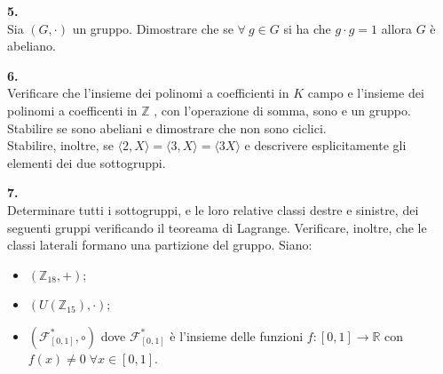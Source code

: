 \documentclass[italian,a4paper,11pt]
{article}
\newcommand{\Z}{\mathbb Z}
\newcommand{\R}{\mathbb{R}}
\newcommand{\acc}{\`}
\begin{document}
\vspace{0.4cm}
\noindent
\begin{Ex}\textbf{ 5.}\\
Sia $(G,\cdot)$ un gruppo. Dimostrare che se $\forall \ g \in G$ si ha che $g\cdot g=1$ allora $G$ \acc e abeliano.
\end{Ex}

\vspace{0.4cm}
\noindent
\begin{Ex}\textbf{ 6.}\\
Verificare che l'insieme dei polinomi a coefficienti in $K$ campo e l'insieme dei polinomi a coefficenti in $\Z$ , con l'operazione di somma, sono e un gruppo. \\
Stabilire se sono abeliani e dimostrare che non sono ciclici. \\
Stabilire, inoltre, se $\langle2,X \rangle =\langle3,X \rangle = \langle 3X \rangle$ e descrivere esplicitamente gli elementi dei due sottogruppi.
\end{Ex}



\vspace{0.4cm}
\noindent
\begin{Ex}\textbf{ 7.}\\
Determinare tutti i sottogruppi, e le loro relative classi destre e sinistre, dei seguenti gruppi verificando il teoreama di Lagrange. Verificare, inoltre, che le classi laterali formano una partizione del gruppo.
Siano:
\begin{itemize}
	\item $(\Z_{18}, +)$;
	\item $(U(\Z_{15}), \cdot)$;
	\item $(\mathcal{F}_{[0,1]}^*, \circ)$ dove $\mathcal{F}_{[0,1]}^*$ \acc e l'insieme delle funzioni $f: [0,1] \longrightarrow \R$ con $f(x)\neq 0 \; \forall x\in [0,1]$.
\end{itemize}
\end{Ex}
\end{document}
